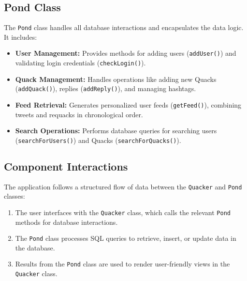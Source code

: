 \documentclass[12pt]{article}
\begin{document}
	\subsection*{Pond Class}
	The \texttt{Pond} class handles all database interactions and encapsulates the data logic. It includes:
	\begin{itemize}
		\item \textbf{User Management:} Provides methods for adding users (\texttt{addUser()}) and validating login credentials (\texttt{checkLogin()}).
		\item \textbf{Quack Management:} Handles operations like adding new Quacks (\texttt{addQuack()}), replies (\texttt{addReply()}), and managing hashtags.
		\item \textbf{Feed Retrieval:} Generates personalized user feeds (\texttt{getFeed()}), combining tweets and requacks in chronological order.
		\item \textbf{Search Operations:} Performs database queries for searching users (\texttt{searchForUsers()}) and Quacks (\texttt{searchForQuacks()}).
	\end{itemize}

	\subsection*{Component Interactions}
	The application follows a structured flow of data between the \texttt{Quacker} and \texttt{Pond} classes:
	\begin{enumerate}
		\item The user interfaces with the \texttt{Quacker} class, which calls the relevant \texttt{Pond} methods for database interactions.
		\item The \texttt{Pond} class processes SQL queries to retrieve, insert, or update data in the database.
		\item Results from the \texttt{Pond} class are used to render user-friendly views in the \texttt{Quacker} class.
	\end{enumerate}

\newpage

\end{document}

